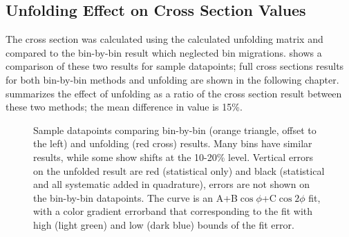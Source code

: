     \clearpage
    \subsection{Unfolding Effect on Cross Section Values}
    The cross section was calculated using the calculated unfolding matrix and compared to the bin-by-bin result which neglected bin migrations.  shows a comparison of these two results for sample datapoints; full cross sections results for both bin-by-bin methods and unfolding are shown in the following chapter.  summarizes the effect of unfolding as a ratio of the cross section result between these two methods; the mean difference in value is 15\%.
     

    \begin{figure}[H]
        \centering
    \caption[Bin-by-bin and Unfolded Cross Section Examples]{Sample datapoints comparing bin-by-bin (orange triangle, offset to the left) and unfolding (red cross) results. Many bins have similar results, while some show shifts at the 10-20\% level. Vertical errors on the unfolded result are red (statistical only) and black (statistical and all systematic added in quadrature), errors are not shown on the bin-by-bin datapoints. The curve is an A+B$\cos{\phi}$+C$\cos{2\phi}$ fit, with a color gradient errorband that corresponding to the fit with high (light green) and low (dark blue) bounds of the fit error.}\label{fig:binbybinIBU}
    \end{figure}

